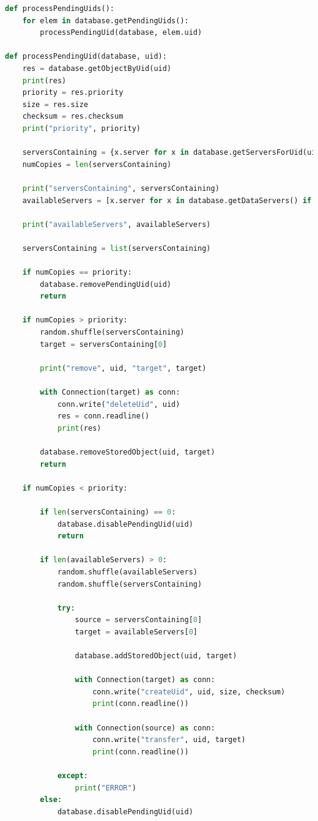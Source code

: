 \documentclass{article}
\begin{document}
\begin{lstlisting}[language=Python, title=Mantenimento del grado di replicazione dei documenti]
def processPendingUids():
    for elem in database.getPendingUids():
        processPendingUid(database, elem.uid)

def processPendingUid(database, uid):
    res = database.getObjectByUid(uid)
    print(res)
    priority = res.priority
    size = res.size
    checksum = res.checksum
    print("priority", priority)

    serversContaining = {x.server for x in database.getServersForUid(uid)}
    numCopies = len(serversContaining)

    print("serversContaining", serversContaining)
    availableServers = [x.server for x in database.getDataServers() if x.server not in serversContaining]

    print("availableServers", availableServers)

    serversContaining = list(serversContaining)

    if numCopies == priority:
        database.removePendingUid(uid)
        return

    if numCopies > priority:
        random.shuffle(serversContaining)
        target = serversContaining[0]

        print("remove", uid, "target", target)

        with Connection(target) as conn:
            conn.write("deleteUid", uid)
            res = conn.readline()
            print(res)

        database.removeStoredObject(uid, target)
        return

    if numCopies < priority:

        if len(serversContaining) == 0:
            database.disablePendingUid(uid)
            return

        if len(availableServers) > 0:
            random.shuffle(availableServers)
            random.shuffle(serversContaining)

            try:
                source = serversContaining[0]
                target = availableServers[0]

                database.addStoredObject(uid, target)

                with Connection(target) as conn:
                    conn.write("createUid", uid, size, checksum)
                    print(conn.readline())

                with Connection(source) as conn:
                    conn.write("transfer", uid, target)
                    print(conn.readline())

            except:
                print("ERROR")
        else:
            database.disablePendingUid(uid)
\end{lstlisting}
\end{document}

